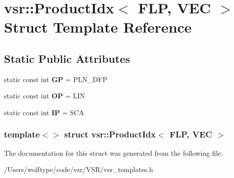 \hypertarget{structvsr_1_1_product_idx_3_01_f_l_p_00_01_v_e_c_01_4}{\section{vsr\-:\-:Product\-Idx$<$ F\-L\-P, V\-E\-C $>$ Struct Template Reference}
\label{structvsr_1_1_product_idx_3_01_f_l_p_00_01_v_e_c_01_4}
}
\subsection*{Static Public Attributes}
\begin{DoxyCompactItemize}
\item 
\hypertarget{structvsr_1_1_product_idx_3_01_f_l_p_00_01_v_e_c_01_4_a3f4a9615848c8c1db64f7c13dbfdf1f2}{static const int {\bfseries G\-P} = P\-L\-N\-\_\-\-D\-F\-P}\label{structvsr_1_1_product_idx_3_01_f_l_p_00_01_v_e_c_01_4_a3f4a9615848c8c1db64f7c13dbfdf1f2}

\item 
\hypertarget{structvsr_1_1_product_idx_3_01_f_l_p_00_01_v_e_c_01_4_ac295aeffb86c7916961e28c361015122}{static const int {\bfseries O\-P} = L\-I\-N}\label{structvsr_1_1_product_idx_3_01_f_l_p_00_01_v_e_c_01_4_ac295aeffb86c7916961e28c361015122}

\item 
\hypertarget{structvsr_1_1_product_idx_3_01_f_l_p_00_01_v_e_c_01_4_a9c894378cc93948ab1ece82bfd91d1b1}{static const int {\bfseries I\-P} = S\-C\-A}\label{structvsr_1_1_product_idx_3_01_f_l_p_00_01_v_e_c_01_4_a9c894378cc93948ab1ece82bfd91d1b1}

\end{DoxyCompactItemize}
\subsubsection*{template$<$$>$ struct vsr\-::\-Product\-Idx$<$ F\-L\-P, V\-E\-C $>$}



The documentation for this struct was generated from the following file\-:\begin{DoxyCompactItemize}
\item 
/\-Users/wolftype/code/vsr/\-V\-S\-R/vsr\-\_\-templates.\-h\end{DoxyCompactItemize}

